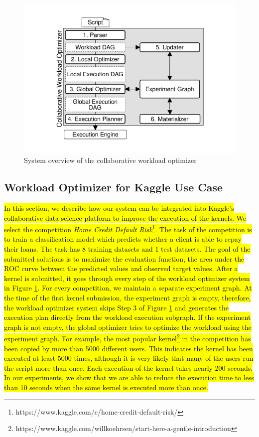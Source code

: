 \begin{figure}
\centering
\includegraphics[width=0.7\columnwidth]{../images/system-workflow}
\caption{System overview of the collaborative workload optimizer}
\label{system-workflow}
\end{figure}

\subsection{Workload Optimizer for Kaggle Use Case}
\hl{In this section, we describe how our system can be integrated into Kaggle's collaborative data science platform to improve the execution of the kernels.
We select the competition \textit{Home Credit Default Risk}\footnote{https://www.kaggle.com/c/home-credit-default-risk/}.
The task of the competition is to train a classification model which predicts whether a client is able to repay their loans.
The task has 8 training datasets and 1 test datasets.
The goal of the submitted solutions is to maximize the evaluation function, the area under the ROC curve between the predicted values and observed target values.
After a kernel is submitted, it goes through every step of the workload optimizer system in Figure \ref{system-workflow}.
For every competition, we maintain a separate experiment graph.
At the time of the first kernel submission, the experiment graph is empty, therefore, the workload optimizer system skips Step 3 of Figure \ref{system-workflow} and generates the execution plan directly from the workload execution subgraph.
If the experiment graph is not empty, the global optimizer tries to optimize the workload using the experiment graph.
For example, the most popular kernel\footnote{https://www.kaggle.com/willkoehrsen/start-here-a-gentle-introduction} in the competition has been copied by more than 5000 different users.
This indicates the kernel has been executed at least 5000 times, although it is very likely that many of the users run the script more than once.
Each execution of the kernel takes nearly 200 seconds.
In our experiments, we show that we are able to reduce the execution time to less than 10 seconds when the same kernel is executed more than once.}